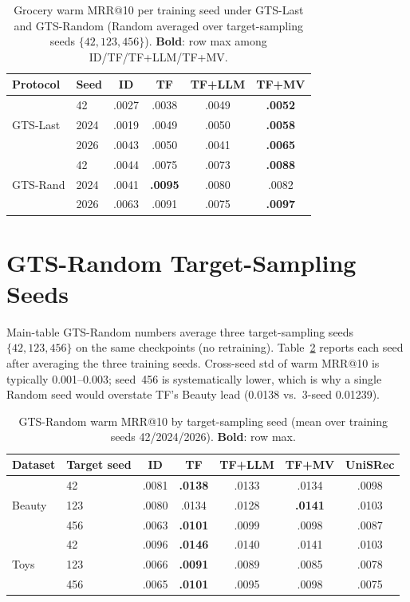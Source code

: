 \documentclass[sigconf,natbib=true,anonymous]{acmart}
\begin{document}
\begin{table}[H]
\centering
\caption{Grocery warm MRR@10 per training seed under GTS-Last and GTS-Random (Random averaged over target-sampling seeds $\{42,123,456\}$).
\textbf{Bold}: row max among ID/TF/TF+LLM/TF+MV.}
\label{tab:grocery-perseed}
\small
\setlength{\tabcolsep}{3pt}
\begin{tabular}{@{}llcccc@{}}
\toprule
Protocol & Seed & ID & TF & TF+LLM & TF+MV \\
\midrule
\multirow{3}{*}{GTS-Last}
 & 42    & .0027 & .0038 & .0049 & \textbf{.0052} \\
 & 2024  & .0019 & .0049 & .0050 & \textbf{.0058} \\
 & 2026  & .0043 & .0050 & .0041 & \textbf{.0065} \\
\midrule
\multirow{3}{*}{GTS-Rand}
 & 42    & .0044 & .0075 & .0073 & \textbf{.0088} \\
 & 2024  & .0041 & \textbf{.0095} & .0080 & .0082 \\
 & 2026  & .0063 & .0091 & .0075 & \textbf{.0097} \\
\bottomrule
\end{tabular}
\end{table}

\section{GTS-Random Target-Sampling Seeds}
\label{app:random-seeds}

Main-table GTS-Random numbers average three target-sampling seeds $\{42,123,456\}$ on the same checkpoints (no retraining).
Table~\ref{tab:random-seeds} reports each seed after averaging the three training seeds.
Cross-seed std of warm MRR@10 is typically 0.001--0.003; seed~456 is systematically lower, which is why a single Random seed would overstate TF's Beauty lead (0.0138 vs.\ 3-seed 0.01239).

\begin{table}[H]
\centering
\caption{GTS-Random warm MRR@10 by target-sampling seed (mean over training seeds 42/2024/2026).
\textbf{Bold}: row max.}
\label{tab:random-seeds}
\small
\setlength{\tabcolsep}{3pt}
\begin{tabular}{@{}llccccc@{}}
\toprule
Dataset & Target seed & ID & TF & TF+LLM & TF+MV & UniSRec \\
\midrule
\multirow{3}{*}{Beauty}
 & 42    & .0081 & \textbf{.0138} & .0133 & .0134 & .0098 \\
 & 123   & .0080 & .0134 & .0128 & \textbf{.0141} & .0103 \\
 & 456   & .0063 & \textbf{.0101} & .0099 & .0098 & .0087 \\
\midrule
\multirow{3}{*}{Toys}
 & 42    & .0096 & \textbf{.0146} & .0140 & .0141 & .0103 \\
 & 123   & .0066 & \textbf{.0091} & .0089 & .0085 & .0078 \\
 & 456   & .0065 & \textbf{.0101} & .0095 & .0098 & .0075 \\
\bottomrule
\end{tabular}
\end{table}
\end{document}
